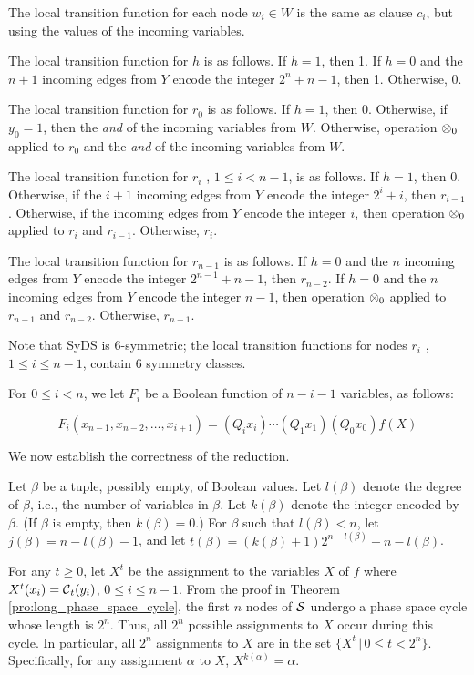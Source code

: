 The local transition function for each node $w_i \in W$ is the same as clause $c_i$,
but using the values of the incoming variables.

The local transition function for $h$ is as follows.
If $h=1$, then 1.
If $h =0$ and  the $n+1$ incoming edges from $Y$ encode the integer $2^n+n-1$, then 1.
Otherwise, $0$.

The local transition function for $r_0$ is as follows.
If $h =1$, then 0.
Otherwise, if $y_0 = 1$, then the {\em and} of the incoming variables from $W$.
Otherwise, operation $\mbox{$\otimes$}_0$ 
applied to $r_0$ and the {\em and} of the incoming variables from $W$.

The local transition function for $r_i$ , $1 \leq i < n-1$, is as follows.
If $h =1$, then 0.
Otherwise, if the $i+1$ incoming edges from $Y$ encode the integer $2^i+i$, 
then $r_{i-1}$.
Otherwise,  if the incoming edges from $Y$ encode the integer $i$, 
then operation $\mbox{$\otimes$}_0$ applied to $r_i$ and $r_{i-1}$.
Otherwise, $r_i$.

The local transition function for $r_{n-1}$ is as follows.
If $h=0$ and the $n$ incoming edges from $Y$ encode the integer $2^{n-1}+n-1$, 
then $r_{n-2}$.
If $h =0$ and  the $n$ incoming edges from $Y$ encode the integer $n-1$, 
then operation $\mbox{$\otimes$}_0$ applied to $r_{n-1}$ and $r_{n-2}$.
Otherwise, $r_{n-1}$.

Note that SyDS \cals{} is 6-symmetric; the local transition functions
for nodes $r_i$ , $1 \leq i \leq n-1$, contain 6 symmetry classes.

For $0 \leq i < n$, we let $F_i$ be a Boolean function of $n-i-1$ variables, 
as follows:

\smallskip
\noindent
$$F_i(x_{n-1}, x_{n-2}, \ldots , x_{i+1}) = (Q_ i x_i) 
\cdots (Q_1 x_1) (Q_0 x_0) f(X)$$

\smallskip%

We now establish the correctness of the reduction.

\smallskip

Let $\beta$ be a tuple, possibly empty, of Boolean values. 
Let  $l(\beta)$ denote the degree of $\beta$,
i.e., the number of variables in $\beta$.
Let  $k(\beta)$ denote the integer encoded by $\beta$.
(If  $\beta$ is empty, then $k(\beta) = 0$.)
For $\beta$ such that $l(\beta) < n$, 
let $j(\beta) = n - l(\beta) -1$,
and let $t(\beta) = (k(\beta)+1) 2^{n-l(\beta)} +n -l(\beta)$. 

For any $ t \geq 0$,
let  $X^t$ be the assignment to the variables $X$ of $f$ where 
$X^t(x_i) = \mbox{$\mathcal{C}$} _t(y_i)$, $ 0 \leq i \leq n-1$.
From the proof in Theorem \ref{pro:long_phase_space_cycle}, 
the first $n$ nodes of $\mbox{$\mathcal{S}$}$ undergo a phase space cycle whose length is $2^n$.
Thus, all $2^n$ possible assignments to $X$ occur during this cycle.
In particular, all $2^n$ assignments to $X$ are in the set $\{  X^t \, | \, 0 \leq t < 2^n \}$.
Specifically, for any assignment $\alpha$ to $X$, $X^{k(\alpha)} = \alpha$.


